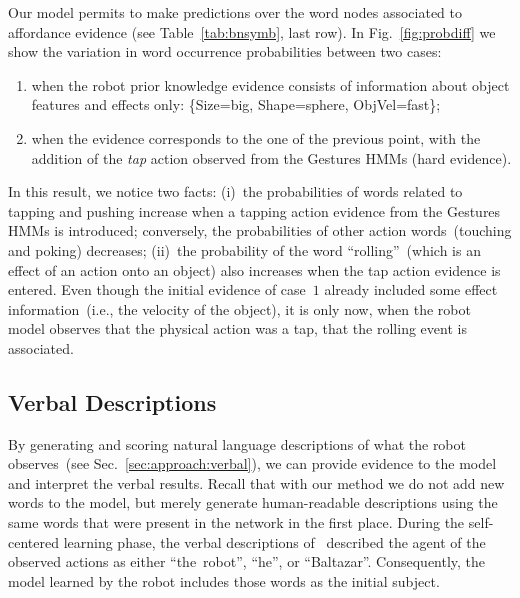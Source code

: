 Our model permits to make predictions over the word nodes associated to affordance evidence (see Table~\ref{tab:bnsymb}, last row).
In Fig.~\ref{fig:probdiff} we show the variation in word occurrence probabilities between two cases:
\begin{enumerate}
\item when the robot prior knowledge evidence consists of information about object features and effects only: \{Size=big, Shape=sphere, ObjVel=fast\};

\item when the evidence corresponds to the one of the previous point, with the addition of the \emph{tap} action observed from the Gestures \acp{HMM} (hard evidence).
\end{enumerate}

In this result, we notice two facts: (i)~the probabilities of words related to tapping and pushing increase when a tapping action evidence from the Gestures \acp{HMM} is introduced; conversely, the probabilities of other action words~(touching and poking) decreases; (ii)~the probability of the word ``rolling''~(which is an effect of an action onto an object) also increases when the tap action evidence is entered. Even though the initial evidence of case~$1$ already included some effect information~(i.e., the velocity of the object), it is only now, when the robot model observes that the physical action was a tap, that the rolling event is associated.

\subsection{Verbal Descriptions}


By generating and scoring natural language descriptions of what the robot observes~(see Sec.~\ref{sec:approach:verbal}), we can provide evidence to the model and interpret the verbal results.
Recall that with our method we do not add new words to the model, but merely generate human-readable descriptions using the same words that were present in the \AffWords{} network in the first place.
During the self-centered learning phase, the verbal descriptions of~\cite{salvi:2012:smcb} described the agent of the observed actions as either ``the~robot'', ``he'', or ``Baltazar''.
Consequently, the \AffWords{} model learned by the robot includes those words as the initial subject.

